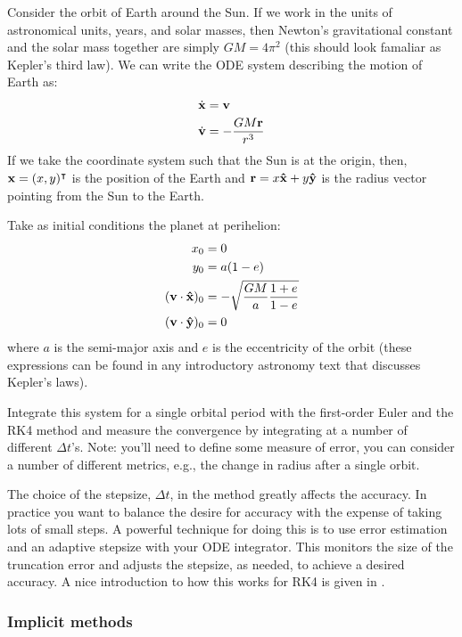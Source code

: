 \begin{exercise}
Consider the orbit of Earth around the Sun.  If we work in the units
of astronomical units, years, and solar masses, then Newton's gravitational
constant and the solar mass together are simply $G M = 4\pi^2$ (this
should look famaliar as Kepler's third law).  We
can write the ODE system describing the motion of Earth as:
\begin{align}
\dot{\bf x} &= {\bf v} \\
\dot{\bf v} &= -\frac{G M {\bf r}}{r^3}
\end{align}
If we take the coordinate system such that the Sun is at the origin,
then, ${\bf x} = (x, y)^\intercal$ is the position of the Earth
and ${\bf r} = x {\bf \hat{x}} + y {\bf \hat{y}}$ is the radius
vector pointing from the Sun to the Earth.

Take as initial conditions the planet at perihelion:
\begin{align*}
x_0 &= 0 \\
y_0 &= a (1-e) \\
({\bf v}\cdot {\bf \hat{x}})_0 &= -\sqrt{\frac{GM}{a} \frac{1+e}{1-e}} \\
({\bf v}\cdot {\bf \hat{y}})_0 &= 0
\end{align*}
where $a$ is the semi-major axis and $e$ is the eccentricity of the orbit
(these expressions can be found in any introductory astronomy text that
discusses Kepler's laws).

Integrate this system for a single orbital period with the first-order
Euler and the RK4 method and measure the convergence by integrating at
a number of different $\Delta t$'s.  Note: you'll need to define some
measure of error, you can consider a number of different metrics, e.g.,
the change in radius after a single orbit.
\end{exercise}

The choice of the stepsize, $\Delta t$, in the method greatly affects
the accuracy.  In practice you want to balance the desire for accuracy
with the expense of taking lots of small steps.  A powerful technique
for doing this is to use error estimation and an adaptive stepsize with
your ODE integrator.  This monitors the size of the truncation error
and adjusts the stepsize, as needed, to achieve a desired accuracy.  A
nice introduction to how this works for RK4 is given in \cite{garcia}.

\subsubsection{Implicit methods}

